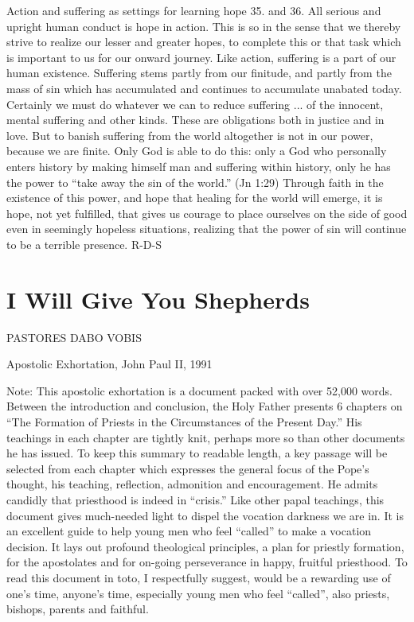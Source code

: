 \documentclass[oneside]{book}
\begin{document}
Action and suffering as settings for learning hope
35. and 36.  All serious and upright human conduct is hope in action. This is so
in the sense that we thereby strive to realize our lesser and greater hopes, to
complete this or that task which is important to us for our onward journey. Like
action, suffering is a part of our human existence. Suffering stems partly from
our finitude, and partly from the mass of sin which has accumulated and
continues to accumulate unabated today. Certainly we must do whatever we can to
reduce suffering ... of the innocent, mental suffering and other kinds. These
are obligations both in justice and in love. But to banish suffering from the
world altogether is not in our power, because we are finite. Only God is able to
do this: only a God who personally enters history by making himself man and
suffering within history, only he has the power to ``take away the sin of the
world.'' (Jn 1:29) Through faith in the existence of this power, and hope that
healing for the world will emerge, it is hope, not yet fulfilled, that gives us
courage to place ourselves on the side of good even in seemingly hopeless
situations, realizing that the power of sin will continue to be a terrible
presence.
R-D-S


\chapter{I Will Give You Shepherds}

PASTORES DABO VOBIS

Apostolic Exhortation, John Paul II, 1991


Note: This apostolic exhortation is a document packed with over 52,000
words. Between the introduction and conclusion, the Holy Father presents 6
chapters on ``The Formation of Priests in the Circumstances of the Present
Day.'' His teachings in each chapter are tightly knit, perhaps more so than
other documents he has issued. To keep this summary to readable length, a key
passage will be selected from each chapter which expresses the general focus of
the Pope's thought, his teaching, reflection, admonition and encouragement. He
admits candidly that priesthood is indeed in ``crisis.'' Like other papal
teachings, this document gives much-needed light to dispel the vocation darkness
we are in. It is an excellent guide to help young men who feel ``called'' to
make a vocation decision. It lays out profound theological principles, a plan
for priestly formation, for the apostolates and for on-going perseverance in
happy, fruitful priesthood. To read this document in toto, I respectfully
suggest, would be a rewarding use of one's time, anyone's time, especially young
men who feel ``called'', also priests, bishops, parents and faithful.
\end{document}

